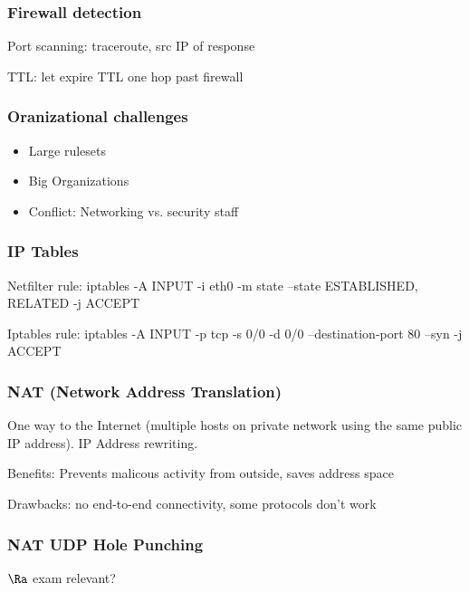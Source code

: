 \documentclass[fs, footer]{latex4ei}
\begin{document}
\begin{multicols*}{4}
{ \subsubsection{Firewall detection} 

 Port scanning: traceroute, src IP of response

 TTL:  let expire TTL one hop past firewall

 \subsubsection{Oranizational challenges}
 \begin{itemize}
  	\item Large rulesets
  	\item Big Organizations
  	\item Conflict: Networking vs. security staff
  \end{itemize} 

  \subsubsection{IP Tables} 
	Netfilter rule: 
	iptables -A INPUT -i eth0 -m state --state ESTABLISHED, RELATED -j ACCEPT
	
	Iptables rule:  iptables -A INPUT -p tcp -s 0/0 -d 0/0 --destination-port 80 --syn -j ACCEPT

	\subsubsection{NAT (Network Address Translation)} 
	One way to the Internet (multiple hosts on private network using the same public IP address). IP Address rewriting.

	Benefits: Prevents malicous activity from outside, saves address space

	Drawbacks: no end-to-end connectivity, some protocols don't work

	\subsubsection{NAT UDP Hole Punching}

	$\Ra$ exam relevant?
}
\end{multicols*}
\end{document}
